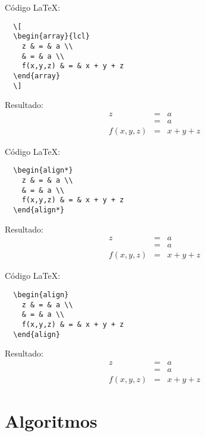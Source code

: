 \documentclass[spanish,12pt,letterpaper]{article}
\theoremstyle{break}
\begin{document}
Código \LaTeX:\\
\begin{verbatim}
  \[
  \begin{array}{lcl}
    z & = & a \\
    & = & a \\
    f(x,y,z) & = & x + y + z
  \end{array} 
  \]
\end{verbatim}
Resultado:\\
\[
\begin{array}{lcl}
  z & = & a \\
  & = & a \\
  f(x,y,z) & = & x + y + z
\end{array} 
\]

Código \LaTeX:\\
\begin{verbatim}
  \begin{align*}
    z & = & a \\
    & = & a \\
    f(x,y,z) & = & x + y + z
  \end{align*}
\end{verbatim}
Resultado:\\
\begin{align*}
  z & = & a \\
  & = & a \\
  f(x,y,z) & = & x + y + z
\end{align*}

Código \LaTeX:\\
\begin{verbatim}
  \begin{align}
    z & = & a \\
    & = & a \\
    f(x,y,z) & = & x + y + z
  \end{align}
\end{verbatim}
Resultado:\\
\begin{align}
  z & = & a \\
  & = & a \\
  f(x,y,z) & = & x + y + z
\end{align}

\newpage %

\section{Algoritmos}
\end{document}
